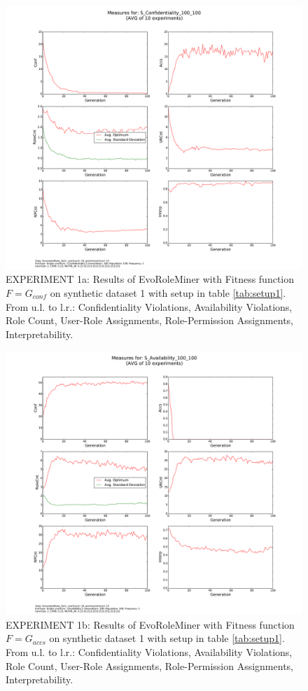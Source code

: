 \begin{figure}[H]
    \centering
    \includegraphics[scale=0.33, trim=4cm 2cm 4cm 0cm, clip=true]{./Figures/exp1conf}
    \caption{EXPERIMENT 1a: Results of EvoRoleMiner with Fitness function $F=G_{conf}$ on synthetic dataset 1 with setup in table \ref{tab:setup1}. From u.l. to l.r.: Confidentiality Violations, Availability Violations, Role Count, User-Role Assignments, Role-Permission Assignments, Interpretability.}
    \label{fig:exp1conf}
\end{figure}

\begin{figure}[H]
    \centering
    \includegraphics[scale=0.33, trim=4cm 2cm 4cm 0cm, clip=true]{./Figures/exp1accs}
    \caption{EXPERIMENT 1b: Results of EvoRoleMiner with Fitness function $F=G_{accs}$ on synthetic dataset 1 with setup in table \ref{tab:setup1}. From u.l. to l.r.: Confidentiality Violations, Availability Violations, Role Count, User-Role Assignments, Role-Permission Assignments, Interpretability.}
    \label{fig:exp1accs}
\end{figure}